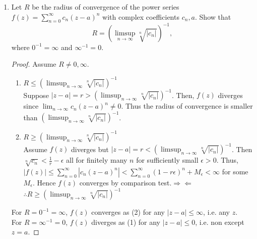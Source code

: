 \documentclass{article}
\begin{document}
\begin{enumerate}[font = \Large\bfseries\itshape\space, leftmargin = 3mm, labelsep = 3mm]
\item
Let $R$ be the radius of convergence of the power series $f(z) = \sum_{n=0}^\infty c_n(z-a)^n$ with complex coefficients $c_n, a$.
Show that
$$
R = \left(\limsup_{n\rightarrow\infty} \sqrt[n]{|c_n|}\right)^{-1},
$$
where $0^{-1} =\infty$ and $\infty^{-1} = 0$.

\begin{proof}
Assume $R \neq 0, \infty$.

\begin{enumerate}[leftmargin = -\parindent]
\item $R \leq \left(\limsup_{n\rightarrow\infty}\sqrt[n]{|c_n|}\right)^{-1}$\\
Suppose $|z-a| = r > \left(\limsup_{n\rightarrow\infty} \sqrt[n]{|c_n|}\right)^{-1}$.
Then, $f(z)$ diverges since $\lim_{n\rightarrow\infty} c_n(z-a)^n \neq 0$.
Thus the radius of convergence is smaller than $\left(\limsup_{n\rightarrow\infty} \sqrt[n]{|c_n|}\right)^{-1}$.

\item $R \geq \left(\limsup_{n\rightarrow\infty}\sqrt[n]{|c_n|}\right)^{-1}$\\
Assume $f(z)$ diverges but $|z-a| = r < \left(\limsup_{n\rightarrow\infty}\sqrt[n]{|c_n|}\right)^{-1}$.
Then $\sqrt[n]{c_n} < \frac{1}{r} - \epsilon$ all for finitely many $n$ for sufficiently small $\epsilon > 0$.
Thus, $|f(z)| \leq \sum_{n=0}^\infty |c_n(z-a)^n| < \sum_{n=0}^\infty (1-r\epsilon)^n + M_\epsilon < \infty$ for some $M_\epsilon$.
Hence $f(z)$ converges by comparison test.$\Rightarrow\!\Leftarrow$
$\therefore R \geq \left(\limsup_{n\rightarrow\infty}\sqrt[n]{|c_n|}\right)^{-1}$
\end{enumerate}

For $R = 0^{-1} = \infty$, $f(z)$ converges as (2) for any $|z-a| \leq \infty$, i.e. any $z$.\\
For $R = \infty^{-1} = 0$, $f(z)$ diverges as (1) for any $|z-a| \leq 0$, i.e. non except $z=a$.

\end{proof}


\end{enumerate}
\end{document}
